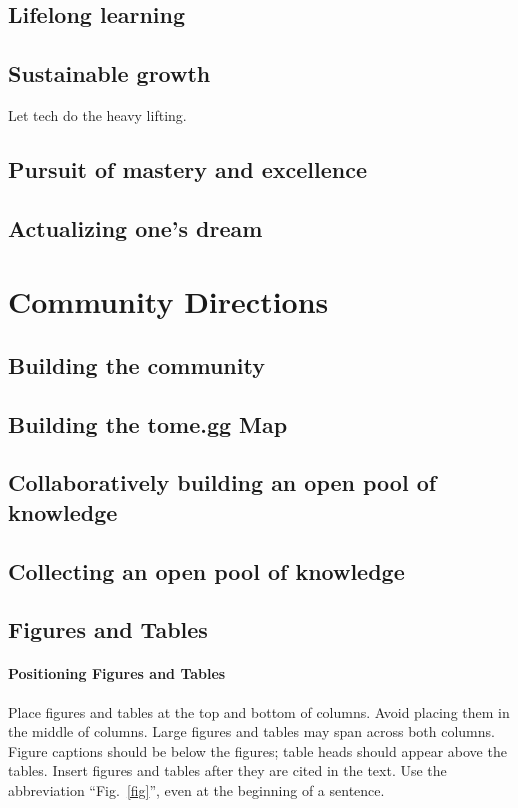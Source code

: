 \documentclass[conference]{IEEEtran}
\begin{document}
\subsection{Lifelong learning}

\subsection{Sustainable growth}

Let tech do the heavy lifting.

\subsection{Pursuit of mastery and excellence}

\subsection{Actualizing one's dream}


\section{Community Directions}
\label{sec:community_directions}

\subsection{Building the community}

\subsection{Building the tome.gg Map}

\subsection{Collaboratively building an open pool of knowledge}

\subsection{Collecting an open pool of knowledge}


\subsection{Figures and Tables}
\paragraph{Positioning Figures and Tables} Place figures and tables at the top and 
bottom of columns. Avoid placing them in the middle of columns. Large 
figures and tables may span across both columns. Figure captions should be 
below the figures; table heads should appear above the tables. Insert 
figures and tables after they are cited in the text. Use the abbreviation 
``Fig.~\ref{fig}'', even at the beginning of a sentence.
\end{document}
